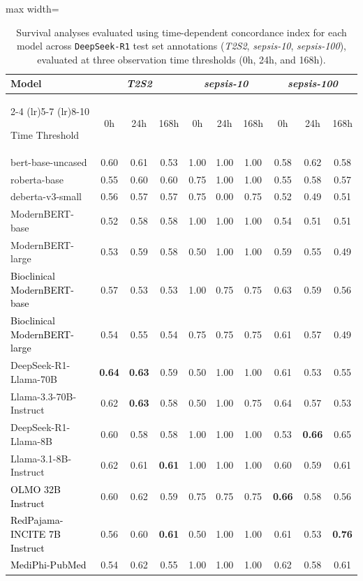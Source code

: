 \begin{table}[htbp]
\caption{Survival analyses evaluated using time-dependent concordance index for each model across \texttt{DeepSeek-R1} test set annotations (\textit{T2S2}, \textit{sepsis-10}, \textit{sepsis-100}), evaluated at three observation time thresholds (0h, 24h, and 168h).
}
\ChSevenTableBodyStart
\begin{ChSevenFloatBody}

\centering
{
\begin{adjustbox}{max width=\linewidth}
\begin{tabular}{lccccccccc}
\toprule
\textbf{Model} 
& \multicolumn{3}{c}{\textit{T2S2}} 
& \multicolumn{3}{c}{\textit{sepsis-10}} 
& \multicolumn{3}{c}{\textit{sepsis-100}} \\
\cmidrule(lr){2-4} \cmidrule(lr){5-7} \cmidrule(lr){8-10}

Time Threshold & 0h & 24h & 168h 
& 0h & 24h & 168h 
& 0h & 24h & 168h \\
\midrule
bert-base-uncased       & 0.60 & 0.61 & 0.53 & 1.00 & 1.00 & 1.00 & 0.58 & 0.62 & 0.58 \\
roberta-base            & 0.55 & 0.60 & 0.60 & 0.75 & 1.00 & 1.00 & 0.55 & 0.58 & 0.57 \\
deberta-v3-small        & 0.56 & 0.57 & 0.57 & 0.75 & 0.00 & 0.75 & 0.52 & 0.49 & 0.51 \\
ModernBERT-base         & 0.52 & 0.58 & 0.58 & 1.00 & 1.00 & 1.00 & 0.54 & 0.51 & 0.51 \\
ModernBERT-large        & 0.53 & 0.59 & 0.58 & 0.50 & 1.00 & 1.00 & 0.59 & 0.55 & 0.49 \\
\textcolor{black}{Bioclinical ModernBERT-base} & 0.57& 0.53& 0.53& 1.00& 0.75& 0.75& 0.63& 0.59& 0.56\\
\textcolor{black}{Bioclinical ModernBERT-large} & 0.54& 0.55 & 0.54 & 0.75 & 0.75 & 0.75& 0.61 & 0.57 & 0.49\\
DeepSeek-R1-Llama-70B   & \textbf{0.64} & \textbf{0.63} & 0.59 & 0.50 & 1.00 & 1.00 & 0.61 & 0.53 & 0.55 \\
Llama-3.3-70B-Instruct  & 0.62 & \textbf{0.63} & 0.58 & 0.50 & 1.00 & 0.75 & 0.64 & 0.57 & 0.53 \\
DeepSeek-R1-Llama-8B    & 0.60 & 0.58 & 0.58 & 1.00 & 1.00 & 1.00 & 0.53 & \textbf{0.66} & {0.65} \\
Llama-3.1-8B-Instruct   & 0.62 & 0.61 & \textbf{0.61} & 1.00 & 1.00 & 1.00 & 0.60 & 0.59 & 0.61 \\
\textcolor{black}{OLMO 32B Instruct} & 0.60& 0.62 & 0.59 & 0.75 & 0.75 & 0.75&\textbf{ 0.66} & 0.58 & 0.56\\
\textcolor{black}{RedPajama-INCITE 7B Instruct} & 0.56&  0.60 & \textbf{0.61} & 0.50 & 1.00 & 1.00& 0.61 & 0.53 & \textbf{0.76}\\
\textcolor{black}{MediPhi-PubMed} & 0.54 & 0.62 & 0.55 & 1.00 & 1.00 & 1.00& 0.62 & 0.58 & 0.61\\
\bottomrule
\end{tabular}
\end{adjustbox}
}



\end{ChSevenFloatBody}
\end{table}
